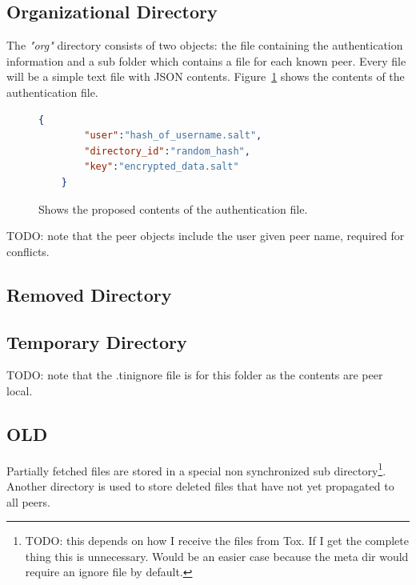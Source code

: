 \subsection{Organizational Directory}
\label{sub:Organizational Directory}

The \textit{"org"} directory consists of two objects: the file containing the authentication information and a sub folder which contains a file for each known peer.
Every file will be a simple text file with JSON contents.
Figure~\ref{json:auth_object} shows the contents of the authentication file.

\begin{figure}[htp]
    \begin{lstlisting}[language=json,firstnumber=0]
    {
        "user":"hash_of_username.salt",
        "directory_id":"random_hash",
        "key":"encrypted_data.salt"
    }
    \end{lstlisting}
\caption[Authentication JSON Object]{Shows the proposed contents of the authentication file.}
\label{json:auth_object}
\end{figure}

TODO: note that the peer objects include the user given peer name, required for conflicts.

\subsection{Removed Directory}
\label{sub:Removed Directory}

\subsection{Temporary Directory}
\label{sub:Temporary Directory}

TODO: note that the .tinignore file is for this folder as the contents are peer local.

\subsection{OLD}
\label{sub:OLD}

Partially fetched files are stored in a special non synchronized sub directory\footnote{TODO: this depends on how I receive the files from Tox. If I get the complete thing this is unnecessary. Would be an easier case because the meta dir would require an ignore file by default.}.
Another directory is used to store deleted files that have not yet propagated to all peers.


